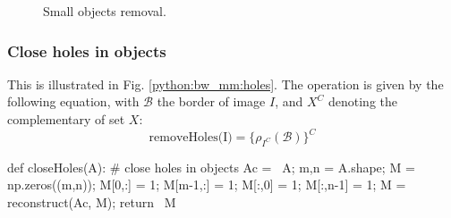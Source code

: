 \vspace*{-8pt}

\begin{figure}[htbp]
 \centering\caption{Small objects removal.}%
 \hfill
 \label{python:bw_mm:small}\vspace*{-8pt}%
\end{figure}

\vspace*{-8pt}

\subsubsection{Close holes in objects}
This is illustrated in Fig. \ref{python:bw_mm:holes}. The operation is given by the following equation, with $\mathcal{B}$ the border of image $I$, and $X^C$ denoting the complementary of set $X$:
\[ \textrm{removeHoles(I)} = \{ \rho_{I^C}(\mathcal{B})\}^C\]
\begin{python}
def closeHoles(A):
	 # close holes in objects
    Ac = ~A;
    m,n = A.shape;
    M = np.zeros((m,n));
    M[0,:] = 1;
    M[m-1,:] = 1;
    M[:,0] = 1;
    M[:,n-1] = 1;
    M = reconstruct(Ac, M);
    return ~M
\end{python}

\vspace*{-10pt}

